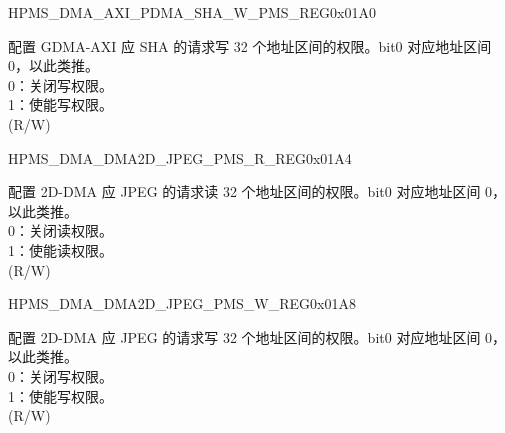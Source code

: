 \begin{register}{H}{PMS\_DMA\_AXI\_PDMA\_SHA\_W\_PMS\_REG}{0x01A0}\label{regdesc:PMSDMAAXIPDMASHAWPMSREG}
%
\regnewline%
\begin{regdesc}\begin{reglist}
\label{fielddesc:PMSDMAAXIPDMASHAWPMS}\item [PMS\_DMA\_AXI\_PDMA\_SHA\_W\_PMS] 配置 GDMA-AXI 应 SHA 的请求写 32 个地址区间的权限。bit0 对应地址区间 0，以此类推。\\
0：关闭写权限。\\
1：使能写权限。\\ (R/W)
\end{reglist}\end{regdesc}
\end{register}


\begin{register}{H}{PMS\_DMA\_DMA2D\_JPEG\_PMS\_R\_REG}{0x01A4}\label{regdesc:PMSDMADMA2DJPEGPMSRREG}
%
\regnewline%
\begin{regdesc}\begin{reglist}
\label{fielddesc:PMSDMADMA2DJPEGRPMS}\item [PMS\_DMA\_DMA2D\_JPEG\_R\_PMS] 配置 2D-DMA 应 JPEG 的请求读 32 个地址区间的权限。bit0 对应地址区间 0，以此类推。\\
0：关闭读权限。\\
1：使能读权限。\\ (R/W)
\end{reglist}\end{regdesc}
\end{register}


\begin{register}{H}{PMS\_DMA\_DMA2D\_JPEG\_PMS\_W\_REG}{0x01A8}\label{regdesc:PMSDMADMA2DJPEGPMSWREG}
%
\regnewline%
\begin{regdesc}\begin{reglist}
\label{fielddesc:PMSDMADMA2DJPEGWPMS}\item [PMS\_DMA\_DMA2D\_JPEG\_W\_PMS] 配置 2D-DMA 应 JPEG 的请求写 32 个地址区间的权限。bit0 对应地址区间 0，以此类推。\\
0：关闭写权限。\\
1：使能写权限。\\ (R/W)
\end{reglist}\end{regdesc}
\end{register}


